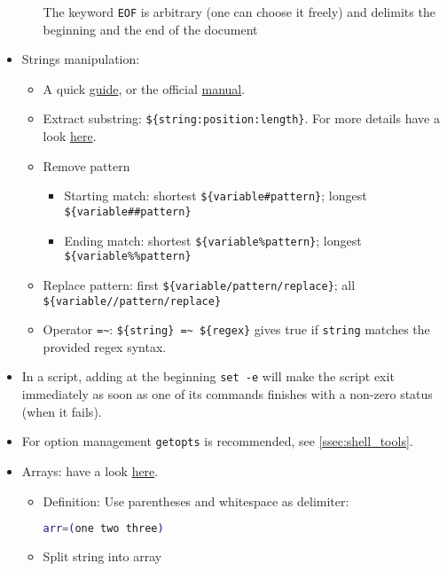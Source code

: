 \documentclass[a4paper,12pt,%
              final%
              ]{article}
\begin{document}
\begin{itemize}
\begin{itemize}
        The keyword \texttt{EOF} is arbitrary (one can choose it freely) and delimits the beginning and the end of the document
    \end{itemize}
  \item Strings manipulation:
    \begin{itemize}
      \item A quick \href{https://sookocheff.com/post/bash/bash-string-operators/}{guide}, or the official \href{https://www.gnu.org/software/bash/manual/html_node/Shell-Parameter-Expansion.html}{manual}.
      \item Extract substring: \verb|${string:position:length}|. For more details have a look \href{https://stackoverflow.com/questions/1405611/how-to-extract-the-first-two-characters-of-a-string-in-shell-scripting}{here}.
      \item Remove pattern
        \begin{itemize}
          \item Starting match: shortest \verb|${variable#pattern}|; longest \verb|${variable##pattern}|
          \item Ending match: shortest \verb|${variable%pattern}|; longest \verb|${variable%%pattern}|
        \end{itemize}
      \item Replace pattern: first \verb|${variable/pattern/replace}|; all \verb|${variable//pattern/replace}|
      \item Operator \verb|=~|: \verb|${string} =~ ${regex}| gives true if \verb|string| matches the provided regex syntax.
    \end{itemize}
  \item In a script, adding at the beginning \verb|set -e| will make the script exit immediately as soon as one of its commands finishes with a non-zero status (when it fails).
  \item For option management \verb|getopts| is recommended, see \autoref{ssec:shell_tools}.
  \item Arrays: have a look \href{https://opensource.com/article/18/5/you-dont-know-bash-intro-bash-arrays}{here}.
    \begin{itemize}
      \item Definition: Use parentheses and whitespace as delimiter:
\begin{lstlisting}[language=bash]
arr=(one two three)
\end{lstlisting}
      \item Split string into array
        \begin{itemize}

\end{itemize}
\end{itemize}
\end{itemize}
\end{document}
